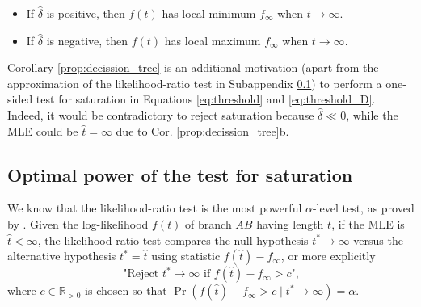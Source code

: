 \begin{appendices}
\begin{cor}
\begin{sloppypar}
\end{sloppypar}
\begin{itemize}
    \item[a)] If $\hat{\delta}$ is positive, then $f(t)$ has local minimum $f_\infty$ when $t \to \infty$.
    \item[b)] If $\hat{\delta}$ is negative, then $f(t)$ has local maximum $f_\infty$ when $t \to \infty$.
\end{itemize}
\end{cor}
Corollary \ref{prop:decission_tree} is an additional motivation (apart from the approximation of the likelihood-ratio test in Subappendix \ref{subsec:approximation}) to perform a one-sided test for saturation in Equations \ref{eq:threshold} and \ref{eq:threshold_D}. Indeed, it would be contradictory to reject saturation because  $\hat{\delta} \ll 0$, while the MLE could be $\hat{t} = \infty$ due to Cor. \ref{prop:decission_tree}b. 

\fi

 
 \subsection{Optimal power of the test for saturation}
\label{subsec:approximation}
We know that the likelihood-ratio test is the most powerful $\alpha$-level test, as proved by \cite{Neyman1933}. 
Given the log-likelihood $f(t)$ of branch $AB$ having length $t$, if the MLE is $\hat{t} < \infty$, the likelihood-ratio test compares the null hypothesis $t^* \to \infty$ versus the alternative hypothesis $t^* = \hat{t}$  using statistic $f(\hat{t})-f_\infty$, or more explicitly
\begin{equation}
    \text{"Reject $t^* \to \infty$ if $f(\hat{t})-f_\infty > c$",}
\end{equation}
 where $c \in \mathbb{R}_{>0}$ is chosen so that $\Pr(f(\hat{t})-f_\infty > c  \mid  t^* \to \infty) = \alpha$.



\end{appendices}
